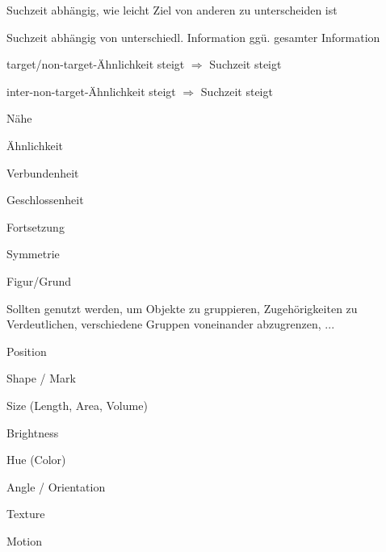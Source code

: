 \documentclass[10pt]{article} %
\begin{document}
\begin{definition}
  \begin{cptitemize}
  \item Suchzeit abhängig, wie leicht Ziel von anderen zu unterscheiden ist
  \item Suchzeit abhängig von unterschiedl. Information ggü. gesamter
    Information
  \item target/non-target-Ähnlichkeit steigt $\Rightarrow$ Suchzeit steigt
    \item inter-non-target-Ähnlichkeit steigt $\Rightarrow$ Suchzeit steigt
  \end{cptitemize}
\end{definition}

\begin{definition}
  \begin{cptenumerate}
  \item Nähe
  \item Ähnlichkeit
  \item Verbundenheit
  \item Geschlossenheit
  \item Fortsetzung
  \item Symmetrie
  \item Figur/Grund
  \end{cptenumerate}
  Sollten genutzt werden, um Objekte zu gruppieren, Zugehörigkeiten zu
  Verdeutlichen, verschiedene Gruppen voneinander abzugrenzen, ...
\end{definition}

\begin{definition}
  \begin{cptitemize}
  \item Position
  \item Shape / Mark
  \item Size (Length, Area, Volume)
  \item Brightness
  \item Hue (Color)
  \item Angle / Orientation
  \item Texture
  \item Motion
  \end{cptitemize}
\end{definition}
\end{document}
